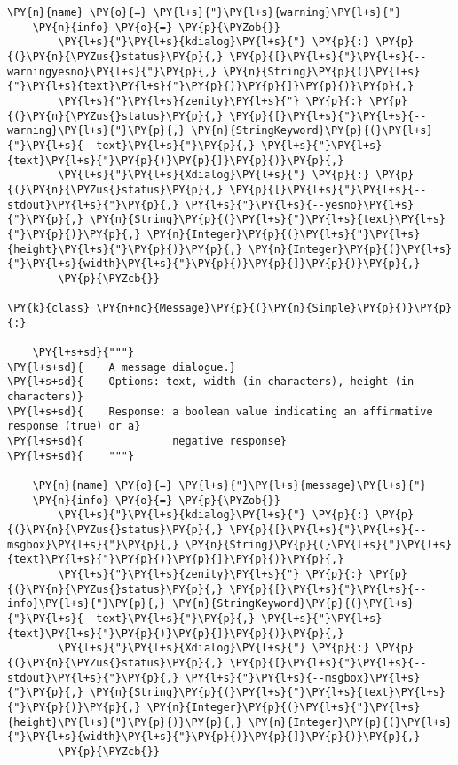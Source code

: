 \begin{Verbatim}[commandchars=\\\{\}]
    \PY{n}{name} \PY{o}{=} \PY{l+s}{"}\PY{l+s}{warning}\PY{l+s}{"}
    \PY{n}{info} \PY{o}{=} \PY{p}{\PYZob{}}
        \PY{l+s}{"}\PY{l+s}{kdialog}\PY{l+s}{"} \PY{p}{:} \PY{p}{(}\PY{n}{\PYZus{}status}\PY{p}{,} \PY{p}{[}\PY{l+s}{"}\PY{l+s}{--warningyesno}\PY{l+s}{"}\PY{p}{,} \PY{n}{String}\PY{p}{(}\PY{l+s}{"}\PY{l+s}{text}\PY{l+s}{"}\PY{p}{)}\PY{p}{]}\PY{p}{)}\PY{p}{,}
        \PY{l+s}{"}\PY{l+s}{zenity}\PY{l+s}{"} \PY{p}{:} \PY{p}{(}\PY{n}{\PYZus{}status}\PY{p}{,} \PY{p}{[}\PY{l+s}{"}\PY{l+s}{--warning}\PY{l+s}{"}\PY{p}{,} \PY{n}{StringKeyword}\PY{p}{(}\PY{l+s}{"}\PY{l+s}{--text}\PY{l+s}{"}\PY{p}{,} \PY{l+s}{"}\PY{l+s}{text}\PY{l+s}{"}\PY{p}{)}\PY{p}{]}\PY{p}{)}\PY{p}{,}
        \PY{l+s}{"}\PY{l+s}{Xdialog}\PY{l+s}{"} \PY{p}{:} \PY{p}{(}\PY{n}{\PYZus{}status}\PY{p}{,} \PY{p}{[}\PY{l+s}{"}\PY{l+s}{--stdout}\PY{l+s}{"}\PY{p}{,} \PY{l+s}{"}\PY{l+s}{--yesno}\PY{l+s}{"}\PY{p}{,} \PY{n}{String}\PY{p}{(}\PY{l+s}{"}\PY{l+s}{text}\PY{l+s}{"}\PY{p}{)}\PY{p}{,} \PY{n}{Integer}\PY{p}{(}\PY{l+s}{"}\PY{l+s}{height}\PY{l+s}{"}\PY{p}{)}\PY{p}{,} \PY{n}{Integer}\PY{p}{(}\PY{l+s}{"}\PY{l+s}{width}\PY{l+s}{"}\PY{p}{)}\PY{p}{]}\PY{p}{)}\PY{p}{,}
        \PY{p}{\PYZcb{}}

\PY{k}{class} \PY{n+nc}{Message}\PY{p}{(}\PY{n}{Simple}\PY{p}{)}\PY{p}{:}

    \PY{l+s+sd}{"""}
\PY{l+s+sd}{    A message dialogue.}
\PY{l+s+sd}{    Options: text, width (in characters), height (in characters)}
\PY{l+s+sd}{    Response: a boolean value indicating an affirmative response (true) or a}
\PY{l+s+sd}{              negative response}
\PY{l+s+sd}{    """}

    \PY{n}{name} \PY{o}{=} \PY{l+s}{"}\PY{l+s}{message}\PY{l+s}{"}
    \PY{n}{info} \PY{o}{=} \PY{p}{\PYZob{}}
        \PY{l+s}{"}\PY{l+s}{kdialog}\PY{l+s}{"} \PY{p}{:} \PY{p}{(}\PY{n}{\PYZus{}status}\PY{p}{,} \PY{p}{[}\PY{l+s}{"}\PY{l+s}{--msgbox}\PY{l+s}{"}\PY{p}{,} \PY{n}{String}\PY{p}{(}\PY{l+s}{"}\PY{l+s}{text}\PY{l+s}{"}\PY{p}{)}\PY{p}{]}\PY{p}{)}\PY{p}{,}
        \PY{l+s}{"}\PY{l+s}{zenity}\PY{l+s}{"} \PY{p}{:} \PY{p}{(}\PY{n}{\PYZus{}status}\PY{p}{,} \PY{p}{[}\PY{l+s}{"}\PY{l+s}{--info}\PY{l+s}{"}\PY{p}{,} \PY{n}{StringKeyword}\PY{p}{(}\PY{l+s}{"}\PY{l+s}{--text}\PY{l+s}{"}\PY{p}{,} \PY{l+s}{"}\PY{l+s}{text}\PY{l+s}{"}\PY{p}{)}\PY{p}{]}\PY{p}{)}\PY{p}{,}
        \PY{l+s}{"}\PY{l+s}{Xdialog}\PY{l+s}{"} \PY{p}{:} \PY{p}{(}\PY{n}{\PYZus{}status}\PY{p}{,} \PY{p}{[}\PY{l+s}{"}\PY{l+s}{--stdout}\PY{l+s}{"}\PY{p}{,} \PY{l+s}{"}\PY{l+s}{--msgbox}\PY{l+s}{"}\PY{p}{,} \PY{n}{String}\PY{p}{(}\PY{l+s}{"}\PY{l+s}{text}\PY{l+s}{"}\PY{p}{)}\PY{p}{,} \PY{n}{Integer}\PY{p}{(}\PY{l+s}{"}\PY{l+s}{height}\PY{l+s}{"}\PY{p}{)}\PY{p}{,} \PY{n}{Integer}\PY{p}{(}\PY{l+s}{"}\PY{l+s}{width}\PY{l+s}{"}\PY{p}{)}\PY{p}{]}\PY{p}{)}\PY{p}{,}
        \PY{p}{\PYZcb{}}


\end{Verbatim}
